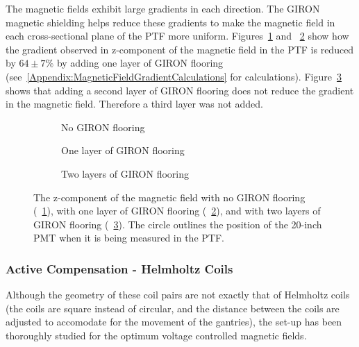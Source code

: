 The magnetic fields exhibit large gradients in each direction. The GIRON magnetic shielding helps reduce these gradients to make the magnetic field in each cross-sectional plane of the PTF more uniform. Figures~\ref{fig:bfield_gironeffects_a} and ~\ref{fig:bfield_gironeffects_b} show how the gradient observed in z-component of the magnetic field in the PTF is reduced by $ 64\pm7\% $ by adding one layer of GIRON flooring (see~\ref{Appendix:MagneticFieldGradientCalculations} for calculations).
Figure~\ref{fig:bfield_gironeffects_c} shows that adding a second layer of GIRON flooring does not reduce the gradient in the magnetic field. Therefore a third layer was not added.
%
\begin{figure}[htbp]
  \begin{center}
    \begin{subfigure}
      \texttt{[image: bfield\_0\_no\_compensation\_z\_clrbaredit.pdf]}
      \caption{No GIRON flooring}
      \label{fig:bfield_gironeffects_a}
    \end{subfigure}
    \begin{subfigure}
      \texttt{[image: bfield\_1\_1layerGIRON\_coilsOff\_z\_clrbaredit.pdf]}
      \caption{One layer of GIRON flooring}
      \label{fig:bfield_gironeffects_b}
    \end{subfigure}
    \begin{subfigure}
      \texttt{[image: bfield\_2\_2layerGIRON\_coilsOff\_z\_clrbaredit.pdf]}
      \caption{Two layers of GIRON flooring}
      \label{fig:bfield_gironeffects_c}
    \end{subfigure}
  \caption{The z-component of the magnetic field with no GIRON flooring (~\ref{fig:bfield_gironeffects_a}), with one layer of GIRON flooring (~\ref{fig:bfield_gironeffects_b}), and with two layers of GIRON flooring (~\ref{fig:bfield_gironeffects_c}). The circle outlines the position of the 20-inch PMT when it is being measured in the PTF.}
  \label{fig:bfield_gironeffects}
  \end{center}
\end{figure}
%
\subsubsection{Active Compensation - Helmholtz Coils}

Although the geometry of these coil pairs are not exactly that of Helmholtz coils (the coils are square instead of circular, and the distance between the coils are adjusted to accomodate for the movement of the gantries), the set-up has been thoroughly studied for the optimum voltage controlled magnetic fields.

